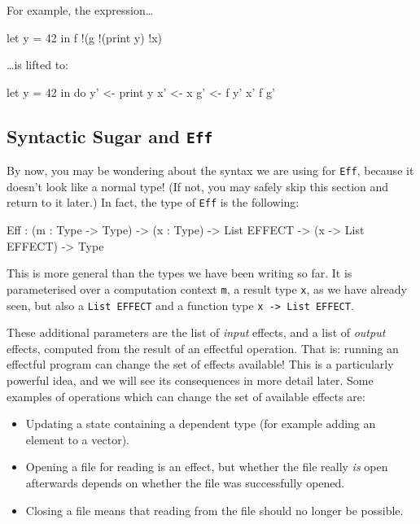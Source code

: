 For example, the expression\ldots

\begin{code}
let y = 42 in f !(g !(print y) !x) 
\end{code}

\ldots is lifted to:

\begin{code}
let y = 42 in do y' <- print y
                 x' <- x
                 g' <- f y' x'
                 f g'
\end{code}


\subsection{Syntactic Sugar and \texttt{Eff}}

By now, you may be wondering about the syntax we are using for \texttt{Eff},
because it doesn't look like a normal \Idris{} type! (If not, you may
safely skip this section and return to it later.) In fact, the type of
\texttt{Eff} is the following:

\begin{code}
Eff : (m : Type -> Type) ->
      (x : Type) ->
      List EFFECT -> (x -> List EFFECT) -> Type
\end{code}

\noindent
This is more general than the types we have been writing so far. It is
parameterised over a computation context \texttt{m}, a result type \texttt{x},
as we have already seen, but also a \texttt{List EFFECT} and a function type
\texttt{x -> List EFFECT}.

These additional parameters are the list of \emph{input} effects, and a list
of \emph{output} effects, computed from the result of an effectful operation.
That is: running an effectful program can change the set of effects available!
This is a particularly powerful idea, and we will see its consequences in more
detail later. Some examples of operations which can change the set of available
effects are:

\begin{itemize}
\item Updating a state containing a dependent type (for example adding an
element to a vector).
\item Opening a file for reading is an effect, but whether the file really
\emph{is} open afterwards depends on whether the file was successfully opened.
\item Closing a file means that reading from the file should no longer be
possible.
\end{itemize}

